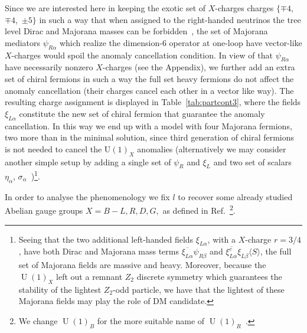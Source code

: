 \documentclass[12pt]{article}
\begin{document}
Since we are interested here in keeping the exotic set of $X$-charges
charges $\{\mp 4$,~$\mp 4$,~$\pm 5\}$ in such a way that when assigned
to the right-handed neutrinos the tree level Dirac and Majorana masses
can be forbidden~\cite{Calle:2018ovc}, the set of Majorana mediators
$\psi_{R\alpha}$ which realize the dimension-6 operator at one-loop
have vector-like $X$-charges would spoil the anomaly cancellation
condition.
In view of that $\psi_{R\alpha}$ have necessarily nonzero $X$-charges (see the Appendix), we further add an extra set of chiral fermions in 
such a way the full set heavy fermions  do not affect
the anomaly cancellation (their charges cancel each other in a vector like way). 
The resulting charge assignment is displayed in
Table~\ref{tab:partcont3}, where 
the fields $\xi_{L \alpha}$ constitute the new set of chiral fermion that guarantee the anomaly cancellation.
In this way we end up with a model with four Majorana fermions, two more than in the minimal solution, since third generation of chiral fermions is not needed to cancel the $\operatorname{U(1)}_X$ anomalies (alternatively we may consider another simple setup by adding a single set of $\psi_R$ and $\xi_L$ and two set of scalars $\eta_\alpha$, $\sigma_{\alpha}$~\cite{Reig:2018mdk})\footnote{
Seeing that the two additional left-handed fields $\xi_{L\alpha}$,  with a $X$-charge $r=3/4$,  have both Dirac and Majorana mass terms $\overline{\xi_{L \alpha}}\psi_{R \beta}$ and $ \overline{\xi_{L\alpha}^c }\xi_{L \beta} \langle S\rangle$, the full set of Majorana fields are massive and heavy. 
Moreover, because the $\operatorname{U}(1)_{X}$ left out a remnant $Z_2$ discrete symmetry which guarantees the stability of the lightest $Z_2$-odd particle,  we have that the lightest of these Majorana fields may play the role of DM candidate.}.

In order to analyse the phenomenology we fix $l$ to recover some already studied
Abelian gauge groups $X=B-L,R,D,G,$ as defined in Ref.~\cite{Campos:2017dgc}\footnote{We change $\operatorname{U}(1)_B$ for the more suitable name of $\operatorname{U}(1)_R$~\cite{Jana:2019mez}.}.


\end{document}
